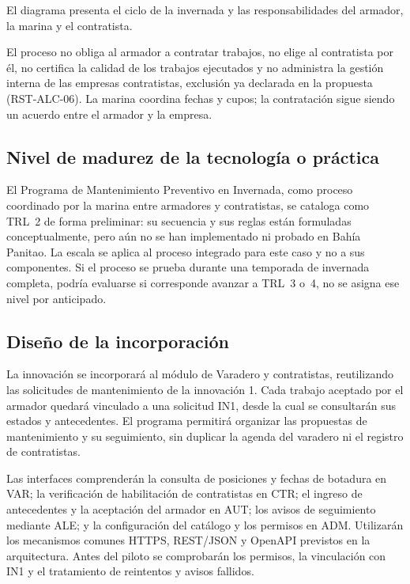 El diagrama presenta el ciclo de la invernada y las responsabilidades del
armador, la marina y el contratista.

El proceso no obliga al armador a contratar trabajos, no elige al contratista por él, no certifica la calidad de los trabajos ejecutados y no administra la gestión interna de las empresas contratistas, exclusión ya declarada en la propuesta (RST-ALC-06). La marina coordina fechas y cupos; la contratación sigue siendo un acuerdo entre el armador y la empresa.








\subsection{Nivel de madurez de la tecnología o práctica}

El Programa de Mantenimiento Preventivo en Invernada, como proceso coordinado por la marina entre armadores y contratistas, se cataloga como TRL~2 de forma preliminar: su secuencia y sus reglas están formuladas conceptualmente, pero aún no se han implementado ni probado en Bahía Panitao. La escala se aplica al proceso integrado para este caso y no a sus componentes. Si el proceso se prueba durante una temporada de invernada completa, podría evaluarse si corresponde avanzar a TRL~3 o~4, no se asigna ese nivel por anticipado.


\subsection{Diseño de la incorporación}

La innovación se incorporará al módulo de Varadero y contratistas,
reutilizando las solicitudes de mantenimiento de la innovación 1.
Cada trabajo aceptado por el armador quedará vinculado a una solicitud
IN1, desde la cual se consultarán sus estados y antecedentes. El
programa permitirá organizar las propuestas de mantenimiento y su
seguimiento, sin duplicar la agenda del varadero ni el registro de
contratistas.

Las interfaces comprenderán la consulta de posiciones y fechas de
botadura en VAR; la verificación de habilitación de contratistas en
CTR; el ingreso de antecedentes y la aceptación del armador en AUT;
los avisos de seguimiento mediante ALE; y la configuración del
catálogo y los permisos en ADM. Utilizarán los mecanismos comunes
HTTPS, REST/JSON y OpenAPI previstos en la arquitectura. Antes del
piloto se comprobarán los permisos, la vinculación con IN1 y el
tratamiento de reintentos y avisos fallidos.

